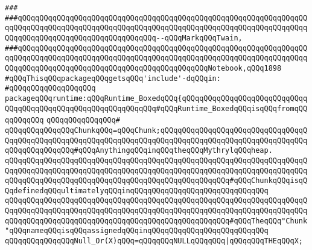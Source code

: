 \verb|###|\newline
\verb|###qQQqqQQqqQQqqQQqqQQqqQQqqQQqqQQqqQQqqQQqqQQqqQQqqQQqqQQqqQQqqQQqqQQqqQQqqQQqqQQqqQQqqQQqqQQqqQQqqQQqqQQqqQQqqQQqqQQqqQQqqQQqqQQqqQQqqQQqqQQqqQQqqQQqqQQqqQQqqQQqqQQqqQQqqQQq--qQQqMarkqQQqTwain,|\newline
\verb|###qQQqqQQqqQQqqQQqqQQqqQQqqQQqqQQqqQQqqQQqqQQqqQQqqQQqqQQqqQQqqQQqqQQqqQQqqQQqqQQqqQQqqQQqqQQqqQQqqQQqqQQqqQQqqQQqqQQqqQQqqQQqqQQqqQQqqQQqqQQqqQQqqQQqqQQqqQQqqQQqqQQqqQQqqQQqqQQqqQQqqQQqNotebook,qQQq1898|\newline
\newline
\newline
\verb|#qQQqThisqQQqpackageqQQqgetsqQQq'include'-dqQQqin:|\newline
\verb|#qQQqqQQqqQQqqQQqqQQq|\newline
\newline
\verb|packageqQQqruntime:qQQqRuntime_BoxedqQQq{qQQqqQQqqQQqqQQqqQQqqQQqqQQqqQQqqQQqqQQqqQQqqQQqqQQqqQQqqQQqqQQq#qQQqRuntime_BoxedqQQqisqQQqfromqQQqqQQqqQQq|\newline
\verb|qQQqqQQqqQQqqQQq#|\newline
\verb|qQQqqQQqqQQqqQQqChunkqQQq=qQQqChunk;qQQqqQQqqQQqqQQqqQQqqQQqqQQqqQQqqQQqqQQqqQQqqQQqqQQqqQQqqQQqqQQqqQQqqQQqqQQqqQQqqQQqqQQqqQQqqQQqqQQqqQQqqQQqqQQqqQQqqQQq#qQQqAnythingqQQqinqQQqtheqQQqMythrylqQQqheap.|\newline
\verb|qQQqqQQqqQQqqQQqqQQqqQQqqQQqqQQqqQQqqQQqqQQqqQQqqQQqqQQqqQQqqQQqqQQqqQQqqQQqqQQqqQQqqQQqqQQqqQQqqQQqqQQqqQQqqQQqqQQqqQQqqQQqqQQqqQQqqQQqqQQqqQQqqQQqqQQqqQQqqQQqqQQqqQQqqQQqqQQqqQQqqQQqqQQqqQQq#qQQqChunkqQQqisqQQqdefinedqQQqultimatelyqQQqinqQQqqQQqqQQqqQQqqQQqqQQqqQQqqQQq|\newline
\verb|qQQqqQQqqQQqqQQqqQQqqQQqqQQqqQQqqQQqqQQqqQQqqQQqqQQqqQQqqQQqqQQqqQQqqQQqqQQqqQQqqQQqqQQqqQQqqQQqqQQqqQQqqQQqqQQqqQQqqQQqqQQqqQQqqQQqqQQqqQQqqQQqqQQqqQQqqQQqqQQqqQQqqQQqqQQqqQQqqQQqqQQqqQQqqQQq#qQQqTheqQQq"Chunk"qQQqnameqQQqisqQQqassignedqQQqinqQQqqQQqqQQqqQQqqQQqqQQqqQQq|\newline
\verb|qQQqqQQqqQQqqQQqNull_Or(X)qQQq=qQQqqQQqNULLqQQqqQQq|\verb#|qQQqqQQqTHEqQQqX;#\newline
